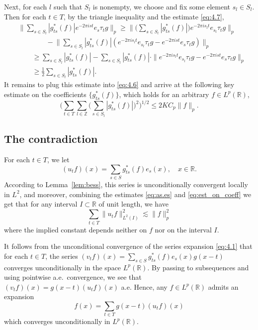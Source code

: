 \documentclass[reqno,a4paper,12pt]{amsart}
\numberwithin{equation}{section}
\numberwithin{figure}{section}
\newcommand\R{\mathbb{R}}
\newcommand\Z{\mathbb{Z}}
\newcommand\1{\mathds{1}}
\newcommand{\TTT}{T}
\newcommand{\SSS}{S}
\newcommand{\ts}{\tau}
\newcommand{\gtss}{g_{ts}^*}
\renewcommand\le{\leqslant}
\renewcommand\ge{\geqslant}
\theoremstyle{plain}
\newcommand{\lemref}[1]{Lemma~\ref{#1}}
\theoremstyle{definition}
\begin{document}
Next, for each $l$ such that $\SSS_l$ is nonempty, we choose and fix some element $s_l\in \SSS_l$. Then for each $t \in T$, by the triangle inequality and the estimate \eqref{eq:4.7},
\begin{align}
& \Big\| \sum_{s\in \SSS_l} |g_{ts}^*(f)|e^{-2\pi i s t} e_s \ts_t g \Big\|_p  \ge \Big\| \Big( \sum_{s\in \SSS_l} |g_{ts}^*(f)| \Big) e^{-2\pi i s_l t} e_{s_l} \ts_t g \Big\|_p \\
& \qquad \qquad - \Big\| \sum_{s\in \SSS_l} |g_{ts}^*(f)|(e^{-2\pi i s_l t}e_{s_l} \ts_t g - e^{-2\pi i s t} e_s \ts_t g )\Big\|_p\\
& \qquad \ge \sum_{s\in \SSS_l} |g_{ts}^*(f)| - \sum_{s\in \SSS_l} |g_{ts}^*(f)| \cdot \|e^{-2\pi i s_l t}e_{s_l} \ts_t g - e^{-2\pi i s t} e_s \ts_t g\|_p \\
& \qquad \ge \frac{1}{2} \sum_{s\in \SSS_l} |g_{ts}^*(f)|.
\end{align}
It remains to plug this estimate into \eqref{eq:4.6} and arrive at the following key estimate on the coefficients $\{g_{ts}^*(f)\}$, which holds for an arbitrary $f\in L^p(\R)$,
\begin{equation}
\label{eq:est_on_coeff}
\Big(\sum_{t\in \TTT} \sum_{l\in \Z} \Big( \sum_{s\in \SSS_l} |g_{ts}^*(f)| \Big)^2 \Big)^{1/2}\le 2KC_p \|f\|_p.
\end{equation}


\subsection{The contradiction}
For each $t \in T$, we let
\begin{equation}
\label{eq:utf}
(u_{t} f)(x) = \sum_{s\in \SSS} g_{ts}^*(f) e_s(x), \quad x \in \R.
\end{equation}
According to \lemref{lem:bess}, this series is unconditionally convergent locally in $L^2$, and moreover, combining the estimates \eqref{eq:as.es} and \eqref{eq:est_on_coeff} we get that for any interval $I\subset\R$ of unit length, we have
\begin{equation}\label{eq:4.19}
\sum_{t\in \TTT} \|u_{t}f\|_{L^2(I)}^2 \lesssim \|f\|^2_p
\end{equation}
where the implied constant depends neither on $f$ nor on the interval $I$.


It follows from the unconditional convergence of the series expansion \eqref{eq:4.1} that for each $t \in \TTT$, the series
$ (v_t f)(x) = \sum_{s\in \SSS} \gtss(f) e_s (x) g(x-t)  $ converges unconditionally in the space $L^p(\R)$. By passing to subsequences and using pointwise a.e.\ convergence, we see that $(v_t f)(x) = g(x-t) (u_t f)(x) $ a.e. Hence, any $f\in L^p(\R)$ admits an expansion
\begin{equation}
\label{eq:4.20}
f(x) = \sum_{t\in \TTT} g(x-t) (u_{t}f)(x)
\end{equation}
which converges unconditionally in $L^p(\R)$.
\end{document}
